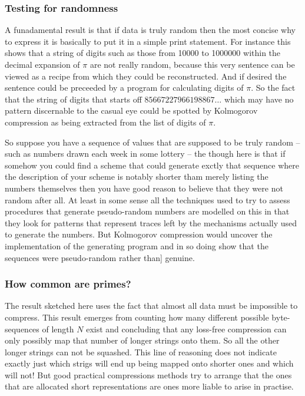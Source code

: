 \subsubsection{Testing for randomness}
A funadamental result is that if data is truly random then the most
concise why to express it is basically to put it in a simple
print statement. For instance this shows that a string of digits
such as those from 10000 to 1000000 within the decimal expansion of
$\pi$ are not really random, because this very sentence can be
viewed as a recipe from which they could be reconstructed. And
if desired the sentence could be preceeded by a program for
calculating digits of $\pi$. So the fact that the string of digits that
starts off $85667227966198867\ldots$ which may have no pattern
discernable to the casual eye could be spotted by Kolmogorov
compression as being extracted from the list of digits of $\pi$.

So suppose you have a sequence of values that are supposed to be truly
random -- such as numbers drawn each week in some lottery -- the
though here is that if somehow you could find a scheme that could
generate exctly that sequence where the description of your scheme
is notably shorter tham merely listing the numbers themselves then you
have good reason to believe that they were not random after all.
At least in some sense all the techniques used to try to assess
procedures that generate pseudo-random numbers are modelled on
this in that they look for patterns that represent traces left by
the mechanisms actually used to generate the numbers. But Kolmogorov
compression would uncover the implementation of the generating program
and in so doing show that the sequences were pseudo-random rather than]
genuine.

\subsubsection{How common are primes?}
The result sketched here uses the fact that almost all data must
be impossible to compress. This result emerges from counting how
many different possible byte-sequences of length $N$ exist and
concluding that any loss-free compression can only possibly map
that number of longer strings onto them. So all the other longer strings
can not be squashed. This line of reasoning does not indicate exactly
just which strigs will end up being mapped onto shorter ones and
which will not! But good practical compressions methods try to
arrange that the ones that are allocated short representations are ones
more liable to arise in practise.

